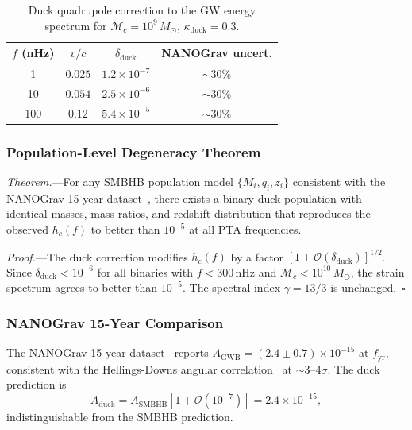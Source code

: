 \documentclass[aps,prd,twocolumn,superscriptaddress,nofootinbib]{revtex4-2}
\newcommand{\Msun}{M_\odot}
\newcommand{\order}[1]{\mathcal{O}(#1)}
\begin{document}
\begin{table}[!htb]
\caption{Duck quadrupole correction to the GW energy spectrum for
$\mathcal{M}_c = 10^9\,\Msun$, $\kappa_{\mathrm{duck}} = 0.3$.}
\label{tab:duck_correction}
\begin{ruledtabular}
\begin{tabular}{cccc}
$f$ (nHz) & $v/c$ & $\delta_{\mathrm{duck}}$ & NANOGrav uncert. \\
\hline
1   & $0.025$ & $1.2 \times 10^{-7}$ & $\sim 30\%$ \\
10  & $0.054$ & $2.5 \times 10^{-6}$ & $\sim 30\%$ \\
100 & $0.12$  & $5.4 \times 10^{-5}$ & $\sim 30\%$ \\
\end{tabular}
\end{ruledtabular}
\end{table}

\subsubsection{Population-Level Degeneracy Theorem}

\textit{Theorem.}---For any SMBHB population model
$\{M_i, q_i, z_i\}$ consistent with the NANOGrav 15-year
dataset~\cite{NANOGrav2023}, there exists a binary duck population with
identical masses, mass ratios, and redshift distribution that reproduces
the observed $h_c(f)$ to better than $10^{-5}$ at all PTA frequencies.

\textit{Proof.}---The duck correction modifies $h_c(f)$ by a factor
$[1 + \order{\delta_{\mathrm{duck}}}]^{1/2}$.
Since $\delta_{\mathrm{duck}} < 10^{-6}$ for all binaries with
$f < 300\,\mathrm{nHz}$ and $\mathcal{M}_c < 10^{10}\,\Msun$, the strain
spectrum agrees to better than $10^{-5}$.
The spectral index $\gamma = 13/3$ is unchanged.~$\square$

\subsubsection{NANOGrav 15-Year Comparison}

The NANOGrav 15-year dataset~\cite{NANOGrav2023} reports
$A_{\mathrm{GWB}} = (2.4 \pm 0.7) \times 10^{-15}$ at
$f_{\mathrm{yr}}$, consistent with the Hellings-Downs angular
correlation~\cite{HellingsDowns1983} at $\sim 3$--$4\sigma$.
The duck prediction is
\begin{equation}
A_{\mathrm{duck}} = A_{\mathrm{SMBHB}} \left[1 +
\order{10^{-7}}\right] = 2.4 \times 10^{-15},
\end{equation}
indistinguishable from the SMBHB prediction.
\end{document}
